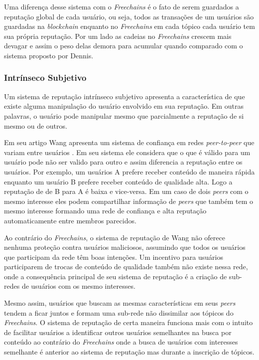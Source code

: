 \documentclass[12pt]{article}
\newcommand{\FC} {\emph{Freechains}\xspace}
\newcommand{\PtoP} {\emph{peer-to-peer}\xspace}
\begin{document}
Uma diferença desse sistema com o \FC é o fato de serem guardados a reputação global de cada usuário, ou seja, todos as transações de um usuários são guardadas na \emph{blockchain} enquanto no \FC em cada tópico cada usuário tem sua própria reputação. 
Por um lado as cadeias no \FC crescem mais devagar e assim o peso delas demora para acumular quando comparado com o sistema proposto por Dennis.

\subsubsection{Intrínseco Subjetivo} \label{subsub:intsub}

Um sistema de reputação intrínseco subjetivo apresenta a característica de que existe alguma manipulação do usuário envolvido em sua reputação. 
Em outras palavras, o usuário pode manipular mesmo que parcialmente a reputação de si mesmo ou de outros.

Em seu artigo Wang apresenta um sistema de confiança em redes \PtoP que variam entre usuários \cite{1231515}. 
Em seu sistema ele considera que o que é válido para um usuário pode não ser valido para outro e assim diferencia a reputação entre os usuários. 
Por exemplo, um usuários A prefere receber conteúdo de maneira rápida enquanto um usuário B prefere receber conteúdo de qualidade alta. 
Logo a reputação de de B para A é baixa e vice-versa. 
Em um caso de dois \emph{peers} com o mesmo interesse eles podem compartilhar informação de \emph{peers} que também tem o mesmo interesse formando uma rede de confiança e alta reputação automaticamente entre membros parecidos.

Ao contrário do \FC, o sistema de reputação de Wang não oferece nenhuma proteção contra usuários maliciosos, assumindo que todos os usuários que participam da rede têm boas intenções. 
Um incentivo para usuários participarem de trocas de conteúdo de qualidade também não existe nessa rede, onde a consequência principal de seu sistema de reputação é a criação de sub-redes de usuários com os mesmo interesses.

Mesmo assim, usuários que buscam as mesmas características em seus \emph{peers} tendem a ficar juntos e formam uma sub-rede não dissimilar aos tópicos do \FC. 
O sistema de reputação de certa maneira funciona mais com o intuito de facilitar usuários a identificar outros usuários semelhantes na busca por conteúdo ao contrário do \FC onde a busca de usuários com interesses semelhante é anterior ao sistema de reputação mas durante a inscrição de tópicos.
\end{document}
